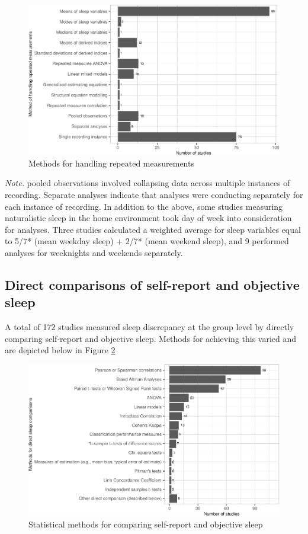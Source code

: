 \documentclass[
]{article}
\begin{document}
\begin{figure}
\centering
\includegraphics{review_markdown_files/figure-latex/methodrm-1.pdf}
\caption{\label{fig:methodrm}Methods for handling repeated measurements}
\end{figure}

\emph{Note.} pooled observations involved collapsing data across multiple instances of recording. Separate analyses indicate that analyses were conducting separately for each instance of recording. In addition to the above, some studies measuring naturalistic sleep in the home environment took day of week into consideration for analyses. Three studies calculated a weighted average for sleep variables equal to 5/7* (mean weekday sleep) + 2/7* (mean weekend sleep), and 9 performed analyses for weeknights and weekends separately.

\subsection{Direct comparisons of self-report and objective sleep}\label{direct-comparisons-of-self-report-and-objective-sleep}

A total of 172 studies measured sleep discrepancy at the group level by directly comparing self-report and objective sleep. Methods for achieving this varied and are depicted below in Figure \ref{fig:group}

\begin{figure}
\centering
\includegraphics{review_markdown_files/figure-latex/group-1.pdf}
\caption{\label{fig:group}Statistical methods for comparing self-report and objective sleep}
\end{figure}
\end{document}
